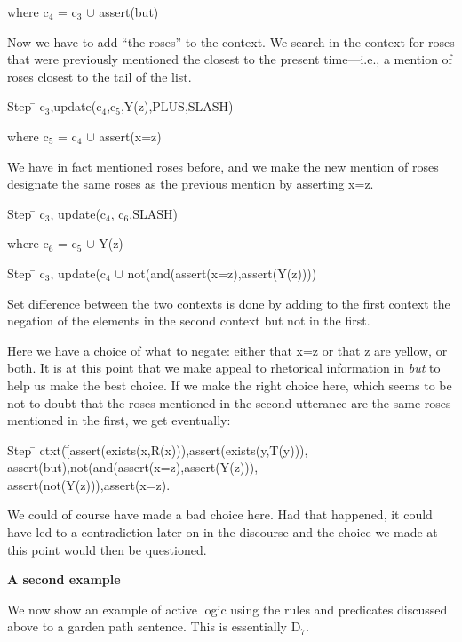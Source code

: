 \documentclass{article}
\begin{document}
where c$_4$ = c$_3$ $\cup$ assert(but)

Now we have to add ``the roses'' to the context. We search in the
context for roses that were previously mentioned the closest to the
present time---i.e., a mention of roses closest to the tail of the
list. 


\begin{tabbing}
Step \= \> c$_3$,update(c$_4$,c$_5$,Y(z),PLUS,SLASH)
\end{tabbing}

where c$_5$ = c$_4$ $\cup$ assert(x=z)

We have in fact mentioned roses before, and we make the new mention of
roses designate the same roses as the previous mention by asserting
x=z. 


\begin{tabbing}
Step \= \> c$_3$, update(c$_4$, c$_6$,SLASH)
\end{tabbing}

where c$_6$ = c$_5$ $\cup$ Y(z)

\begin{tabbing}
Step \= \> c$_3$, update(c$_4$ $\cup$ not(and(assert(x=z),assert(Y(z))))
\end{tabbing}

Set difference between the two contexts is done by adding to the first
context the negation of the elements in the second context but not in
the first.

Here we have a choice of what to negate: either that x=z or that z are
yellow, or both. It is at this point that we make appeal to rhetorical
information in \emph{but} to help us make the best choice. If we make the
right choice here, which seems to be not to doubt that the roses
mentioned in the second utterance are the same roses mentioned in the
first, we get eventually:

\begin{tabbing}
Step \= \kill
\>ctxt(\=[assert(exists(x,R(x))),assert(exists(y,T(y))), assert(but),not(and(assert(x=z),assert(Y(z))),\\
\>\>assert(not(Y(z))),assert(x=z).
\end{tabbing}

We could of course have made a bad choice here. Had that happened,
it could have led to a contradiction later on in the discourse and the
choice we made at this point would then be questioned.

\noindent
\textbf{A second example}

We now show an example of active logic using the rules and predicates
discussed above to a garden path sentence. This is essentially D$_7$.
\end{document}
